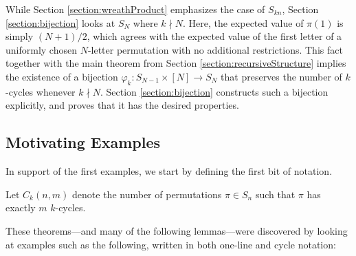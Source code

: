 While Section \ref{section:wreathProduct} emphasizes the case of $S_{kn}$,
Section \ref{section:bijection} looks at $S_N$ where $k \nmid N$. Here, the
expected value of $\pi(1)$ is simply $(N+1)/2$, which agrees with the expected
value of the first letter of a uniformly chosen $N$-letter permutation with
no additional restrictions. This fact together with the main
theorem from Section \ref{section:recursiveStructure} implies the existence of a
bijection $\varphi_k \colon S_{N-1} \times [N] \rightarrow S_N$ that preserves the
number of $k$-cycles whenever $k \nmid N$. Section \ref{section:bijection}
constructs such a bijection explicitly, and proves that it has the desired
properties.

\subsection{Motivating Examples}

In support of the first examples, we start by defining the first bit of notation.
\begin{definition}
  Let $C_k(n,m)$ denote the number of permutations $\pi \in S_n$ such that
  $\pi$ has exactly $m$ $k$-cycles.
\end{definition}

These theorems---and many of the following lemmas---were discovered by looking
at examples such as the following, written in both one-line and cycle notation:

